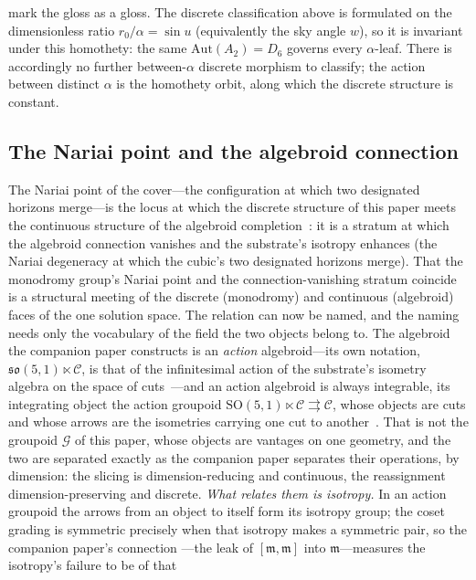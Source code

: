 \documentclass[11pt,a4paper]{article}
\theoremstyle{definition}
\begin{document}
mark the gloss as a gloss. The discrete classification above is formulated on the dimensionless ratio $r_{0}/\alpha=\sin u$ (equivalently the sky angle $w$), so it is invariant under this homothety: the same $\mathrm{Aut}(A_{2})=D_{6}$ governs every $\alpha$-leaf. There is accordingly no further between-$\alpha$ discrete morphism to classify; the action between distinct $\alpha$ is the homothety orbit, along which the discrete structure is constant.

\subsection{The Nariai point and the algebroid connection}\label{sec:nariai-algebroid}

The Nariai point of the cover---the configuration at which two designated horizons merge---is the locus at which the discrete structure of this paper meets the continuous structure of the algebroid completion~\cite{JanzenAlgebroid}: it is a stratum at which the algebroid connection vanishes and the substrate's isotropy enhances (the Nariai degeneracy at which the cubic's two designated horizons merge). That the monodromy group's Nariai point and the connection-vanishing stratum coincide is a structural meeting of the discrete (monodromy) and continuous (algebroid) faces of the one solution space. The relation can now be named, and the naming needs only the vocabulary of the field the two
objects belong to. The algebroid the companion paper constructs is an \emph{action} algebroid---its own
notation, $\mathfrak{so}(5,1)\ltimes\mathcal{C}$, is that of the infinitesimal action of the substrate's isometry
algebra on the space of cuts~\cite{JanzenAlgebroid}---and an action algebroid is always integrable, its
integrating object the action groupoid $\mathrm{SO}(5,1)\ltimes\mathcal{C}\rightrightarrows\mathcal{C}$, whose
objects are cuts and whose arrows are the isometries carrying one cut to another~\cite{Mackenzie2005}. That is
not the groupoid $\mathcal{G}$ of this paper, whose objects are vantages on one geometry, and the two are
separated exactly as the companion paper separates their operations, by dimension: the slicing is
dimension-reducing and continuous, the reassignment dimension-preserving and discrete. \emph{What relates them
is isotropy.} In an action groupoid the arrows from an object to itself form its isotropy group; the coset
grading is symmetric precisely when that isotropy makes a symmetric pair, so the companion paper's connection
---the leak of $[\mathfrak{m},\mathfrak{m}]$ into $\mathfrak{m}$---measures the isotropy's failure to be of that
\end{document}
